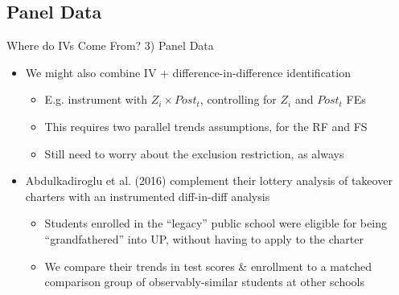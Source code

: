 \documentclass{beamer}
\begin{document}
\subsection{Panel Data}
\begin{frame}{Where do IVs Come From? 3) Panel Data}
\begin{itemize}
\item We might also combine IV + difference-in-difference identification\smallskip
\begin{itemize}
\item E.g. instrument with $Z_i\times Post_t$, controlling for $Z_i$ and $Post_t$ FEs
\smallskip
\item This requires two parallel trends assumptions, for the RF and FS
\smallskip
\item Still need to worry about the exclusion restriction, as always
\end{itemize}\pause{}\medskip
\item Abdulkadiroglu et al. (2016) complement their lottery analysis of takeover charters with an instrumented diff-in-diff analysis\smallskip
\begin{itemize}
\item Students enrolled in the ``legacy'' public school were eligible for being ``grandfathered'' into UP, without having to apply to the charter
\smallskip
\item We compare their trends in test scores \& enrollment to a matched comparison group of observably-similar students at other schools
\end{itemize}
\end{itemize}
\end{frame}
\end{document}
